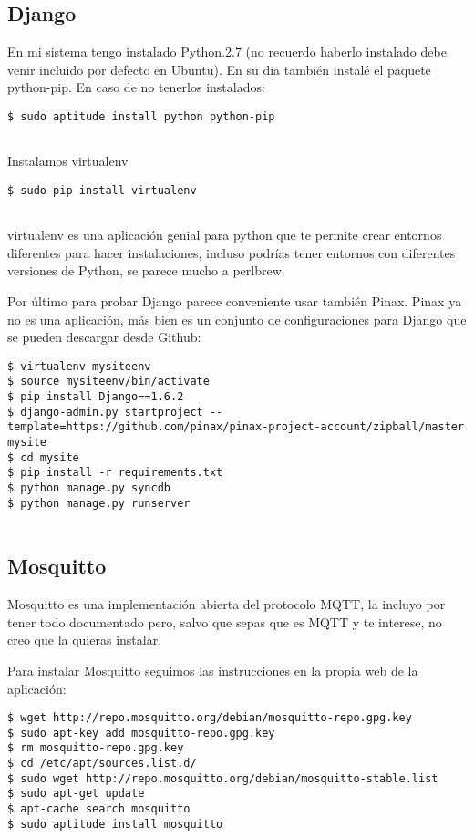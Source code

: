 \subsection{Django}\label{django}

En mi sistema tengo instalado Python.2.7 (no recuerdo haberlo instalado
debe venir incluido por defecto en Ubuntu). En su dia también instalé el
paquete python-pip. En caso de no tenerlos instalados:

\begin{verbatim}
$ sudo aptitude install python python-pip
      
\end{verbatim}

Instalamos virtualenv

\begin{verbatim}
$ sudo pip install virtualenv
      
\end{verbatim}

virtualenv es una aplicación genial para python que te permite crear
entornos diferentes para hacer instalaciones, incluso podrías tener
entornos con diferentes versiones de Python, se parece mucho a perlbrew.

Por último para probar Django parece conveniente usar también Pinax.
Pinax ya no es una aplicación, más bien es un conjunto de
configuraciones para Django que se pueden descargar desde Github:

\begin{verbatim}
$ virtualenv mysiteenv
$ source mysiteenv/bin/activate
$ pip install Django==1.6.2
$ django-admin.py startproject --template=https://github.com/pinax/pinax-project-account/zipball/master mysite
$ cd mysite
$ pip install -r requirements.txt
$ python manage.py syncdb
$ python manage.py runserver
      
\end{verbatim}

\subsection{Mosquitto}\label{mosquitto}

Mosquitto es una implementación abierta del protocolo MQTT, la incluyo
por tener todo documentado pero, salvo que sepas que es MQTT y te
interese, no creo que la quieras instalar.

Para instalar Mosquitto seguimos las instrucciones en la propia web de
la aplicación:

\begin{verbatim}
$ wget http://repo.mosquitto.org/debian/mosquitto-repo.gpg.key
$ sudo apt-key add mosquitto-repo.gpg.key
$ rm mosquitto-repo.gpg.key
$ cd /etc/apt/sources.list.d/
$ sudo wget http://repo.mosquitto.org/debian/mosquitto-stable.list
$ sudo apt-get update
$ apt-cache search mosquitto
$ sudo aptitude install mosquitto
      
\end{verbatim}

